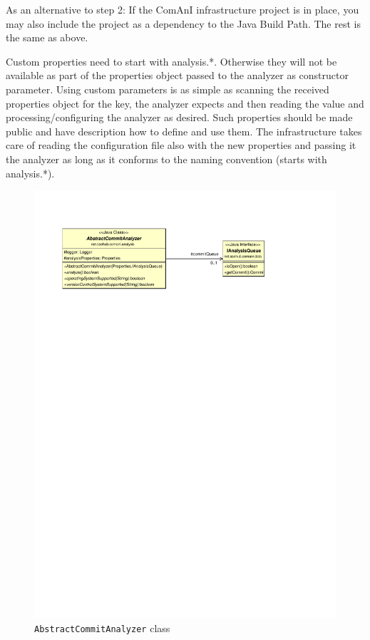 {As an alternative to step 2: If the ComAnI infrastructure project is in place, you may also include the project as a dependency to the Java Build Path. The rest is the same as above.

Custom properties need to start with analysis.*. Otherwise they will not be available as part of the properties object passed to the analyzer as constructor parameter. Using custom parameters is as simple as scanning the received properties object for the key, the analyzer expects and then reading the value and processing/configuring the analyzer as desired. Such properties should be made public and have description how to define and use them. The infrastructure takes care of reading the configuration file also with the new properties and passing it the analyzer as long as it conforms to the naming convention (starts with analysis.*).
}

\begin{figure}[ht] %
	\centering
		\includegraphics[width=\columnwidth,trim={1,9cm 22,8cm 5cm 2,6cm},clip]{inserts/comani_abstract_commit_analyzer.pdf}
  \caption{\thetool{} \texttt{AbstractCommitAnalyzer} class}
	\label{fig:AbstractCommitAnalyzerClass}
\end{figure}

\begin{figure}[ht]
	\centering
		
\end{figure}